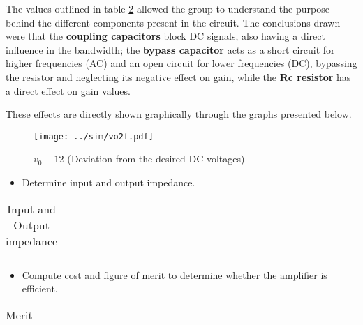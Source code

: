 \par The values outlined in table \ref{sim1} allowed the group to understand the purpose behind the different components present in the circuit. The conclusions drawn were that the \textbf{coupling capacitors} block DC signals, also having a direct influence in the bandwidth; the \textbf{bypass capacitor} acts as a short circuit for higher frequencies (AC) and an open circuit for lower frequencies (DC), bypassing the resistor and neglecting its negative effect on gain, while the \textbf{Rc resistor} has a direct effect on gain values.
\par These effects are directly shown graphically through the graphs presented below.

\begin{figure}[H]
    \texttt{[image: ../sim/vo2f.pdf]}
    \centering
    \caption{$v_0-12$ (Deviation from the desired DC voltages)}
    \label{mag}
\end{figure}

\begin{itemize}
	\item Determine input and output impedance.
\end{itemize}

\begin{table}[H]
  \centering
  \begin{tabular}{|c|c|}
    \hline    
    
    
  \end{tabular}
  \caption{Input and Output impedance}
  \label{sim1}
\end{table}


\begin{itemize}
	\item Compute cost and figure of merit to determine whether the amplifier is efficient. 
\end{itemize}

\begin{table}[H]
  \centering
  \begin{tabular}{|c|c|}
    \hline    
    
  \end{tabular}
  \caption{Merit}
  \label{sim1}
\end{table}



























